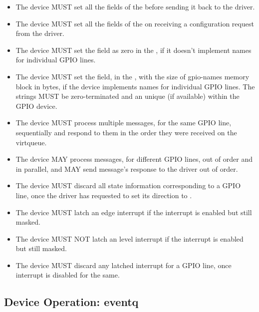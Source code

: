 \begin{itemize}
\item The device MUST set all the fields of the  before sending it back to the driver.

\item The device MUST set all the fields of the  on receiving a configuration request from the driver.

\item The device MUST set the  field as zero in the
    , if it doesn't implement names for
    individual GPIO lines.

\item The device MUST set the  field, in the
    , with the size of gpio-names memory block
    in bytes, if the device implements names for individual GPIO lines. The
    strings MUST be zero-terminated and an unique (if available) within the GPIO
    device.

\item The device MUST process multiple messages, for the same GPIO line,
    sequentially and respond to them in the order they were received on the
    virtqueue.

\item The device MAY process messages, for different GPIO lines, out of order
    and in parallel, and MAY send message's response to the driver out of order.

\item The device MUST discard all state information corresponding to a GPIO
    line, once the driver has requested to set its direction to
    .

\item The device MUST latch an edge interrupt if the interrupt is enabled but
    still masked.

\item The device MUST NOT latch an level interrupt if the interrupt is enabled
    but still masked.

\item The device MUST discard any latched interrupt for a GPIO line, once
    interrupt is disabled for the same.
\end{itemize}

\subsection{Device Operation: eventq}\label{sec:Device Types / GPIO Device / eventq Operation}

